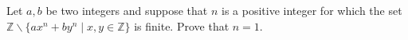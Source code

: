 Let \(a,b\) be two integers and suppose that \(n\) is a positive integer for which the set \(\mathbb{Z} \backslash \{ax^n + by^n \mid x,y \in \mathbb{Z}\}\) is finite. Prove that \(n=1\).
